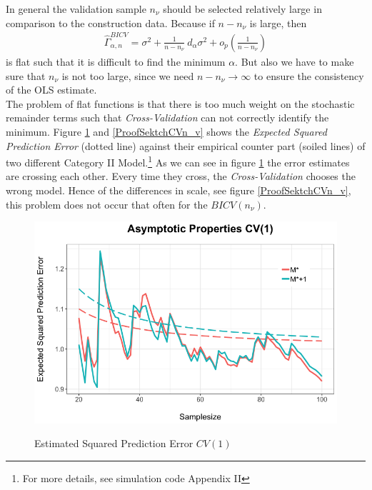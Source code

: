 \documentclass[Research_Module_ES.tex]{subfiles}
\begin{document}
In general the validation sample $n_\nu$ should be selected relatively large in comparison to the construction data. Because if $n-n_\nu$ is large, then 
\begin{align*}
\hat{\Gamma}^{BICV}_{\alpha,n}=\sigma^2+\frac{1}{n-n_\nu}~d_\alpha\sigma^2+o_p\left(\frac{1}{n-n_\nu}\right)
\end{align*}
is flat such that it is difficult to find the minimum $\alpha$. But also we have to make sure that $n_\nu$ is not too large, since we need $n-n_\nu\to\infty$ to ensure the consistency of the OLS estimate.\\

The problem of flat functions is that  there is too much weight on the stochastic remainder terms such that \textit{Cross-Validation} can not correctly identify the minimum. Figure \ref{ProofSketchCV1} and \ref{ProofSektchCVn_v} shows the \textit{Expected Squared Prediction Error} (dotted line) against their empirical counter part (soiled lines) of two different Category II Model.\footnote{For more details, see simulation code Appendix II} As we can see in figure \ref{ProofSketchCV1} the error estimates are crossing each other. Every time they cross, the \textit{Cross-Validation} chooses the wrong model. Hence of the differences in scale, see figure \ref{ProofSektchCVn_v}, this problem does not occur that often for the $BICV(n_\nu)$.\\
\begin{figure}[!h]
	\label{ProofSketchCV1}
	\centering
	\includegraphics[width=1\textwidth]{ProofSketchN1.png}\\
	\caption{Estimated Squared Prediction Error $CV(1)$}
\end{figure}
\end{document}
